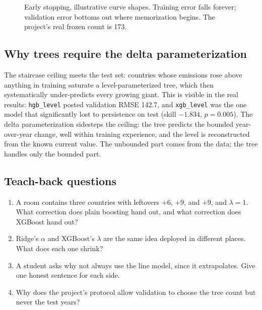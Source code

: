 \documentclass[11pt]{article}
\begin{document}
\begin{figure}[ht]
\centering
{}
\caption{Early stopping, illustrative curve shapes. Training error falls
forever; validation error bottoms out where memorization begins. The
project's real frozen count is 173.}
\label{fig:earlystop}
\end{figure}

\subsection{Why trees require the delta parameterization}

The staircase ceiling meets the test set: countries whose emissions rose
above anything in training saturate a level-parameterized tree, which
then systematically under-predicts every growing giant. This is visible
in the real results: \texttt{hgb\_level} posted validation RMSE 142.7,
and \texttt{xgb\_level} was the one model that significantly lost to
persistence on test (skill $-1.834$, $p = 0.005$). The delta
parameterization sidesteps the ceiling: the tree predicts the bounded
year-over-year change, well within training experience, and the level is
reconstructed from the known current value. The unbounded part comes from
the data; the tree handles only the bounded part.

\subsection{Teach-back questions}

\begin{enumerate}
\item A room contains three countries with leftovers $+6$, $+9$, and
$+9$, and $\lambda = 1$. What correction does plain boosting hand out,
and what correction does XGBoost hand out?
\item Ridge's $\alpha$ and XGBoost's $\lambda$ are the same idea deployed
in different places. What does each one shrink?
\item A student asks why not always use the line model, since it
extrapolates. Give one honest sentence for each side.
\item Why does the project's protocol allow validation to choose the tree
count but never the test years?
\end{enumerate}
\end{document}
